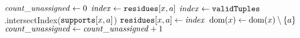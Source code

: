        \label{line:filterDom:0}
      \STATE $\mathit{count\_unassigned} \leftarrow 0$ \label{line:filterDom:1}
       \label{line:filterDom:2}
             \label{line:filterDom:3}
              \STATE $\mathit{index} \leftarrow \texttt{residues}[x,a]$ \label{line:filterDom:res1}
               \label{line:filterDom:res2} %
                  \STATE $\mathit{index} \leftarrow \texttt{validTuples}$.intersectIndex($\texttt{supports}[x,a]$) \label{line:filterDom:4}
                   \label{line:filterDom:5}
                        \STATE $\texttt{residues}[x,a] \leftarrow \mathit{index}$ \label{line:filterDom:6}
                  \ELSE
                        \STATE $\text{dom}({x}) \leftarrow \text{dom}({x}) \setminus \left\{a\right\}$ \label{line:filterDom:7}
                  \ENDIF
              \ENDIF
             \ENDFOREACH
              \label{line:filterDom:8}
                 \STATE $\mathit{count\_unassigned} \leftarrow \mathit{count\_unassigned} + 1$\label{line:filterDom:9}
             \ENDIF

      \ENDFOREACH
       \label{line:filterDom:10}
         \label{line:filterDom:11}
      \ELSE
         \label{line:filterDom:12}
      \ENDIF
      \Endfunc
